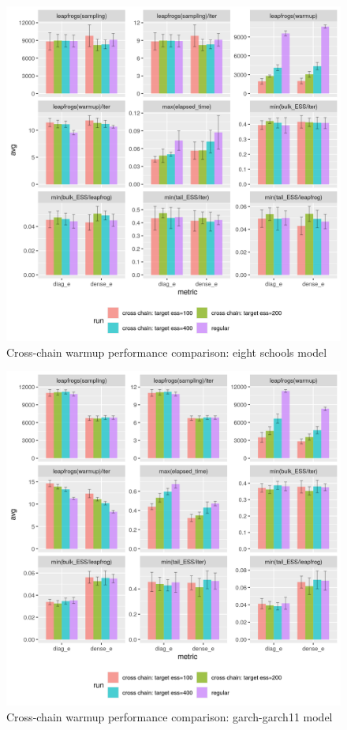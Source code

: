 \documentclass[11pt, reqno, oneside]{amsart}
\begin{document}
\begin{figure}[htbp]
\centering
\includegraphics[width=\textwidth]{./figure/cross_chain_ess_effect_eight_schools.png}
\caption{Cross-chain warmup performance comparison: eight schools model}
\end{figure}

\begin{figure}[htbp]
\centering
\includegraphics[width=\textwidth]{./figure/cross_chain_ess_effect_garch-garch11.png}
\caption{Cross-chain warmup performance comparison: garch-garch11 model}
\end{figure}
\end{document}
